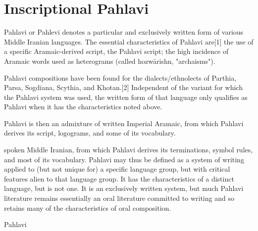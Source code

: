 \section{Inscriptional Pahlavi}
\label{s:inscriptionalpahlavi}
\newfontfamily{}

Pahlavi or Pahlevi denotes a particular and exclusively written form of various Middle Iranian languages. The essential characteristics of Pahlavi are[1]
the use of a specific Aramaic-derived script, the Pahlavi script;
the high incidence of Aramaic words used as heterograms (called hozwārishn, "archaisms").

Pahlavi compositions have been found for the dialects/ethnolects of Parthia, Parsa, Sogdiana, Scythia, and Khotan.[2] Independent of the variant for which the Pahlavi system was used, the written form of that language only qualifies as Pahlavi when it has the characteristics noted above.


Pahlavi is then an admixture of
written Imperial Aramaic, from which Pahlavi derives its script, logograms, and some of its vocabulary.

spoken Middle Iranian, from which Pahlavi derives its terminations, symbol rules, and most of its vocabulary.
Pahlavi may thus be defined as a system of writing applied to (but not unique for) a specific language group, but with critical features alien to that language group. It has the characteristics of a distinct language, but is not one. It is an exclusively written system, but much Pahlavi literature remains essentially an oral literature committed to writing and so retains many of the characteristics of oral composition.

\begin{scriptexample}[]{Pahlavi}
\end{scriptexample}
